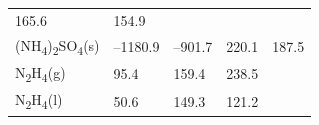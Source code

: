 \documentclass[
  9pt,
]{extbook}
\theoremstyle{definition}
\theoremstyle{definition}
\theoremstyle{definition}
\theoremstyle{remark}
\begin{document}
\begin{longtable}[]{@{}lllll@{}}
\begin{minipage}[t]{0.18\columnwidth}
165.6\strut
\end{minipage} & \begin{minipage}[t]{0.18\columnwidth}\raggedright
154.9\strut
\end{minipage}\tabularnewline
\begin{minipage}[t]{0.10\columnwidth}\raggedright
(NH\textsubscript{4})\textsubscript{2}SO\textsubscript{4}(s)\strut
\end{minipage} & \begin{minipage}[t]{0.19\columnwidth}\raggedright
--1180.9\strut
\end{minipage} & \begin{minipage}[t]{0.20\columnwidth}\raggedright
--901.7\strut
\end{minipage} & \begin{minipage}[t]{0.18\columnwidth}\raggedright
220.1\strut
\end{minipage} & \begin{minipage}[t]{0.18\columnwidth}\raggedright
187.5\strut
\end{minipage}\tabularnewline
\begin{minipage}[t]{0.10\columnwidth}\raggedright
N\textsubscript{2}H\textsubscript{4}(g)\strut
\end{minipage} & \begin{minipage}[t]{0.19\columnwidth}\raggedright
95.4\strut
\end{minipage} & \begin{minipage}[t]{0.20\columnwidth}\raggedright
159.4\strut
\end{minipage} & \begin{minipage}[t]{0.18\columnwidth}\raggedright
238.5\strut
\end{minipage} & \begin{minipage}[t]{0.18\columnwidth}\raggedright
\strut
\end{minipage}\tabularnewline
\begin{minipage}[t]{0.10\columnwidth}\raggedright
N\textsubscript{2}H\textsubscript{4}(l)\strut
\end{minipage} & \begin{minipage}[t]{0.19\columnwidth}\raggedright
50.6\strut
\end{minipage} & \begin{minipage}[t]{0.20\columnwidth}\raggedright
149.3\strut
\end{minipage} & \begin{minipage}[t]{0.18\columnwidth}\raggedright
121.2\strut
\end{minipage} & \begin{minipage}[t]{0.18\columnwidth}\raggedright

\end{minipage}
\end{longtable}
\end{document}
